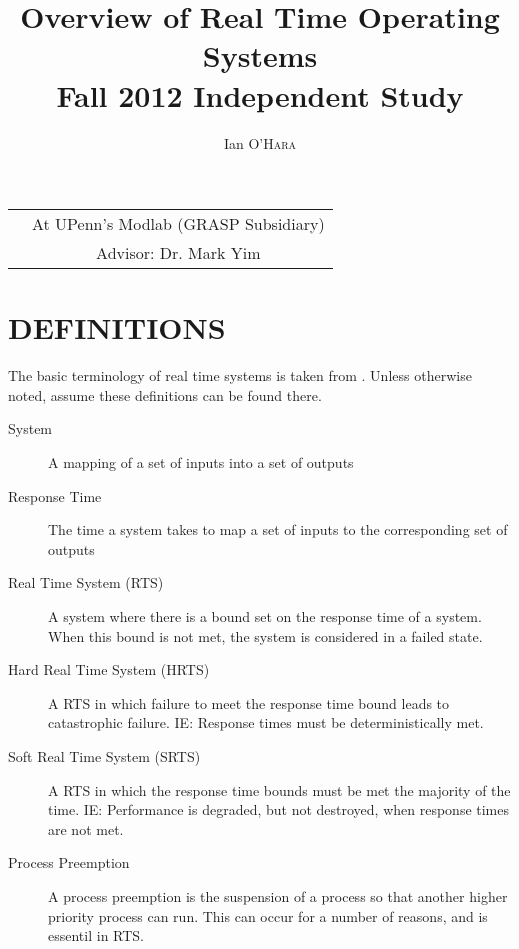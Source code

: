 \documentclass{article}
\title{Overview of Real Time Operating Systems \\ Fall 2012 Independent Study} %
\author{Ian \textsc{O'Hara}} %
\begin{document}
\maketitle %

\begin{tabular}{lc}
\date & At UPenn's Modlab (GRASP Subsidiary)\\ %
&Advisor: Dr. Mark Yim %
\end{tabular}

\setlength\parindent{0pt} %

\renewcommand{\labelenumi}{\alph{enumi}.} %

\newcommand{\TODO}[1]{ {\bf \textcolor{red}{TODO:} #1 }}

\section{DEFINITIONS}
The basic terminology of real time systems is taken from \cite{Laplante}.  Unless otherwise noted, assume these definitions can be found there.
\begin{description}
\item[System]{A mapping of a set of inputs into a set of outputs}
\item[Response Time]{The time a system takes to map a set of inputs to the corresponding set of outputs}
\item[Real Time System (RTS)]{A system where there is a bound set on the response time of a system.  When this bound is not met, the system is considered in a failed state.}
\item[Hard Real Time System (HRTS)]{A RTS in which failure to meet the response time bound leads to catastrophic failure.  IE: Response times must be deterministically met.}
\item[Soft Real Time System (SRTS)]{A RTS in which the response time bounds must be met the majority of the time. IE: Performance is degraded, but not destroyed, when response times are not met.}
\item[Process Preemption]{A process preemption is the suspension of a process so that another higher priority process can run.  This can occur for a number of reasons, and is essentil in RTS.}
\end{description}
\end{document}
